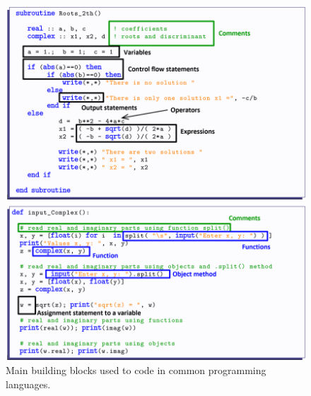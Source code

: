 \begin{figure}[h]
    \centering
    \includegraphics[width=.95\textwidth]{./doc/Figures/components.png}
    \caption{Main building blocks used to code in common programming languages.}
    \label{fig:components}
\end{figure}
\FloatBarrier
%


 
 
 
 
 
 
 







